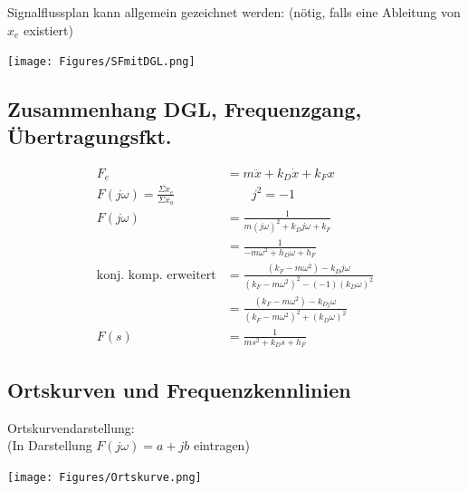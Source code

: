 Signalflussplan kann allgemein gezeichnet werden: (nötig, falls eine Ableitung von $x_e$ existiert)

\texttt{[image: Figures/SFmitDGL.png]}


\subsection{Zusammenhang DGL, Frequenzgang, Übertragungsfkt.}
\begin{align*}
	F_e &= m \ddot{x} + k_D \dot{x} + k_F x \\
	F(j \omega) = \frac{\Sigma x_e}{\Sigma x_a} & \qquad j^2 = -1\\
	F(j \omega) &= \frac{1}{m(j \omega)^2+k_D j \omega+k_F} \\
				&= \frac{1}{-m \omega^2+h_D \omega+h_F} \\
	\text{konj. komp. erweitert}			&= \frac{\left(k_F-m \omega^2\right)-k_D j \omega}{\left(k_F-m \omega^2\right)^2-(-1)\left(k_D \omega\right)^2} \\
				&= \frac{\left(k_F-m \omega^2\right)-k_{D j} \omega}{\left(k_F-m \omega^2\right)^2+\left(k_D \omega\right)^2} \\
	F(s)		&= \frac{1}{m s^2+k_D s+h_F}
\end{align*}

\newpage
\subsection{Ortskurven und Frequenzkennlinien}
Ortskurvendarstellung:\\ 
(In Darstellung $F(j \omega) = a + jb$ eintragen)
\begin{center}
	\texttt{[image: Figures/Ortskurve.png]}
\end{center}

